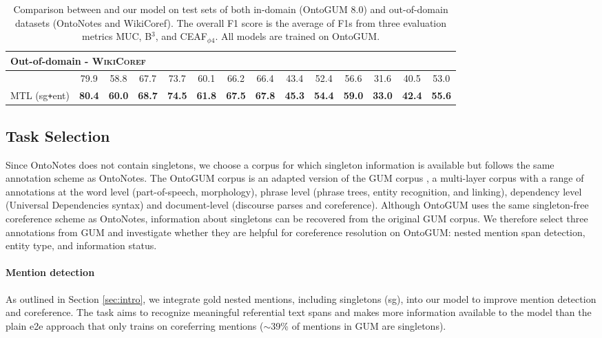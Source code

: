 \documentclass[11pt]{article}
\begin{document}
\begin{table*}[t!hb]
{\begin{tabular}{l|ccc|ccccccccc|c}
    \hline
    \multicolumn{14}{l}{\rule{0pt}{2ex}\textbf{Out-of-domain} - \textsc{WikiCoref}}\\ 
    \hline
    \rule{0pt}{2ex}\citet{DBLP:journals/corr/abs-1907-10529} & 79.9 & 58.8 & 67.7 & 73.7 & 60.1 & 66.2 & 66.4 & 43.4 & 52.4 & 56.6 & 31.6 & 40.5 & 53.0 \\
    \rule{0pt}{2ex}MTL (sg\texttt{+}ent) & \textbf{80.4} & \textbf{60.0} & \textbf{68.7} & \textbf{74.5} & \textbf{61.8} & \textbf{67.5} & \textbf{67.8} & \textbf{45.3} & \textbf{54.4} & \textbf{59.0} & \textbf{33.0} & \textbf{42.4} & \textbf{55.6} \\
    
    \bottomrule
    \end{tabular}
    }
    \caption{Comparison between \citet{DBLP:journals/corr/abs-1907-10529} and our model on test sets of both in-domain (OntoGUM 8.0) and out-of-domain datasets (OntoNotes and WikiCoref). The overall F1 score is the average of F1s from three evaluation metrics MUC, B$^3$, and CEAF$_{\phi4}$. All models are trained on OntoGUM.}
    \label{tab:res}
\end{table*}







\subsection{Task Selection}
Since OntoNotes does not contain singletons, we choose a corpus for which singleton information is available but follows the same annotation scheme as OntoNotes. The OntoGUM corpus \citep{zhu-etal-2021-ontogum} is an adapted version of the GUM corpus \cite{Zeldes2017}, a multi-layer corpus with a range of annotations at the word level (part-of-speech, morphology), phrase level (phrase trees, entity recognition, and linking), dependency level (Universal Dependencies syntax) and document-level (discourse parses and coreference). Although OntoGUM uses the same singleton-free coreference scheme as OntoNotes, information about singletons can be recovered from the original GUM corpus. We therefore select three annotations from GUM and investigate whether they are helpful for coreference resolution on OntoGUM: nested mention span detection, entity type, and information status.

\vspace{-0.2em}
\paragraph{Mention detection} As outlined in Section \ref{sec:intro}, we integrate gold nested mentions, including singletons (sg), into our model to improve mention detection and coreference. The task aims to recognize meaningful referential text spans and makes more information available to the model than the plain e2e approach that only trains on coreferring mentions ($\sim$39\% of mentions in GUM are singletons). 
\end{document}
